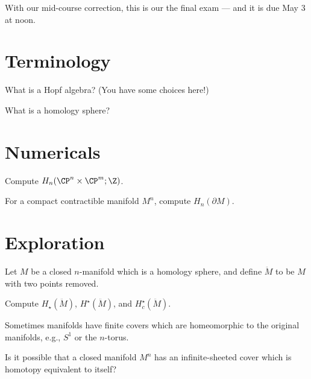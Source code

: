 \documentclass{homework}
\author{Jim Fowler}
\begin{document}
\maketitle

\begin{inspiration}
  With our mid-course correction, this is our the final exam --- and it is due May 3 at noon.
\end{inspiration}

\section{Terminology}

\begin{problem}
  What is a Hopf algebra?  (You have some choices here!)
\end{problem}

\begin{problem}
 What is a homology sphere? 
\end{problem}

\section{Numericals}

\begin{problem}
  Compute $H_n(\CP^n \times \CP^m; \Z)$.
\end{problem}

\begin{problem}
  For a compact contractible manifold $M^n$, compute $H_n(\partial M)$.
\end{problem}

\section{Exploration}

\begin{problem} Let $M$ be a closed $n$-manifold which is a
homology sphere, and define $\ddot{M}$ to be $M$ with two points
removed.

  Compute
  $H_\star(\ddot{M})$,
  $H^\star(\ddot{M})$, and
  $H_c^\star(\ddot{M})$.
\end{problem}

\begin{problem}
  Sometimes manifolds have finite covers which are homeomorphic to the
  original manifolds, e.g., $S^1$ or the $n$-torus.

  Is it possible that a closed manifold $M^n$ has an infinite-sheeted
  cover which is homotopy equivalent to itself?
\end{problem}
\end{document}
